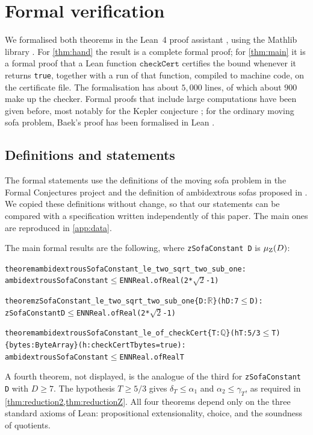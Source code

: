 \section{Formal verification}\label{sec:lean}

We formalised both theorems in the Lean~4 proof assistant \cite{lean4}, using the Mathlib library \cite{mathlib2020}. For \cref{thm:hand} the result is a complete formal proof; for \cref{thm:main} it is a formal proof that a Lean function $\mathtt{checkCert}$ certifies the bound whenever it returns \texttt{true}, together with a run of that function, compiled to machine code, on the certificate file. The formalisation has about $5{,}000$ lines, of which about $900$ make up the checker. Formal proofs that include large computations have been given before, most notably for the Kepler conjecture \cite{hales2017flyspeck}; for the ordinary moving sofa problem, Baek's proof has been formalised in Lean \cite{cureton2026movingsofa,cao2026sofaformal}.

\subsection{Definitions and statements}\label{sec:leanstatements}

The formal statements use the definitions of the moving sofa problem in the Formal Conjectures project \cite{formalconjectures} and the definition of ambidextrous sofas proposed in \cite{fc_pr6424}. We copied these definitions without change, so that our statements can be compared with a specification written independently of this paper. The main ones are reproduced in \cref{app:data}.

The main formal results are the following, where \texttt{zSofaConstant D} is $\mu_{\mathrm{Z}}(D)$:
\begin{alltt}\small
theorem ambidextrousSofaConstant_le_two_sqrt_two_sub_one :
    ambidextrousSofaConstant \(\le\) ENNReal.ofReal (2 * \(\sqrt{2}\) - 1)

theorem zSofaConstant_le_two_sqrt_two_sub_one \{D : \(\mathbb{R}\)\} (hD : 7 \(\le\) D) :
    zSofaConstant D \(\le\) ENNReal.ofReal (2 * \(\sqrt{2}\) - 1)

theorem ambidextrousSofaConstant_le_of_checkCert \{T : \(\mathbb{Q}\)\} (hT : 5/3 \(\le\) T)
    \{bytes : ByteArray\} (h : checkCert T bytes = true) :
    ambidextrousSofaConstant \(\le\) ENNReal.ofReal T
\end{alltt}
A fourth theorem, not displayed, is the analogue of the third for \texttt{zSofaConstant D} with $D\ge7$. The hypothesis $T\ge5/3$ gives $\delta_T\le\alpha_1$ and $\alpha_2\le\gamma_T$, as required in \cref{thm:reduction2,thm:reductionZ}. All four theorems depend only on the three standard axioms of Lean: propositional extensionality, choice, and the soundness of quotients.

